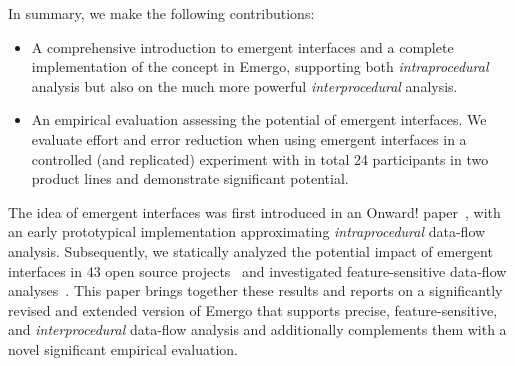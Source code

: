 In summary, we make the following contributions: 
\begin{itemize}

	\item A comprehensive introduction to emergent interfaces and a complete implementation of the concept in Emergo, supporting both \textit{intraprocedural} analysis but also on the much more powerful \textit{interprocedural} analysis.
	
	\item An empirical evaluation assessing the potential of emergent interfaces. We evaluate effort and error reduction when using emergent interfaces in a controlled (and replicated) experiment with in total 24 participants in two product lines and demonstrate significant potential.
\end{itemize}

The idea of emergent interfaces was first introduced in an Onward! paper~\cite{ribeiro-emergent-onward10}, with an early prototypical implementation approximating \textit{intraprocedural} data-flow analysis. Subsequently, we statically analyzed the potential impact of emergent interfaces in 43 open source projects~\cite{ribeiro-feature-dependencies-gpce11} and investigated feature-sensitive data-flow analyses~\cite{brabrand-dfa4spl-aosd12}. This paper brings together these results and reports on a significantly revised and extended version of Emergo that supports precise, feature-sensitive, and \textit{interprocedural} data-flow analysis and additionally complements them with a novel significant empirical evaluation.



